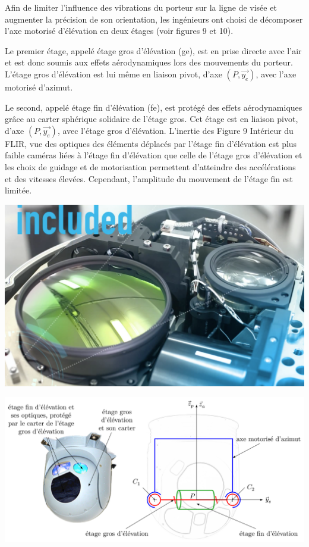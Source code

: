 Afin de limiter l'influence des vibrations du porteur sur la ligne de visée et augmenter la précision de son orientation, les ingénieurs ont choisi de décomposer l'axe motorisé d'élévation en deux étages (voir figures 9 et 10).

Le premier étage, appelé étage gros d'élévation (ge), est en prise directe avec l'air et est donc soumis aux effets aérodynamiques lors des mouvements du porteur. L'étage gros d'élévation est lui même en liaison pivot, d'axe $(P,\overrightarrow{y_e})$, avec l'axe motorisé d'azimut.

Le second, appelé étage fin d'élévation (fe), est protégé des effets aérodynamiques grâce au carter sphérique solidaire de l'étage gros. Cet étage est en liaison pivot, d'axe $(P,\overrightarrow{y_e})$, avec l'étage gros d'élévation. L'inertie des Figure 9 Intérieur du FLIR, vue des optiques des éléments déplacés par l'étage fin d'élévation est plus faible caméras liées à l'étage fin d'élévation que celle de l'étage gros d'élévation et les choix de guidage
et de motorisation permettent d'atteindre des accélérations et des vitesses élevées. Cependant, l'amplitude du mouvement de l'étage fin est limitée.

\begin{center}
\includegraphics[width=0.5\linewidth]{img/fig09}
\end{center}

\begin{center}
\includegraphics[width=0.8\linewidth]{img/fig10}
\end{center}

